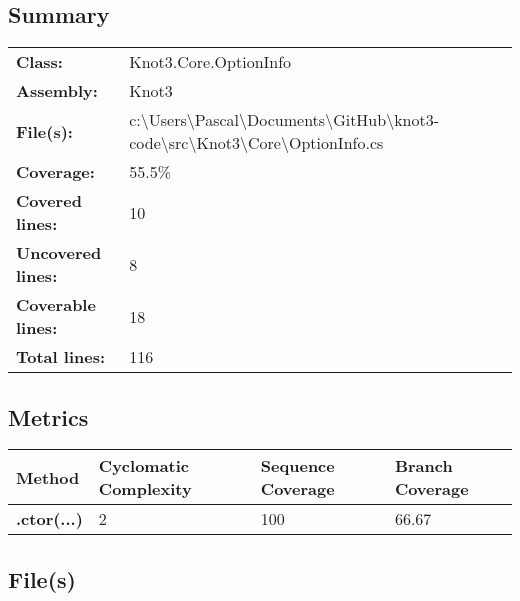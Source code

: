 \documentclass[a4paper,10pt]{article}
\begin{document}
\subsection{Summary}
\begin{longtable}[l]{ll}
\textbf{Class:} & Knot3.Core.OptionInfo\\
\textbf{Assembly:} & Knot3\\
\textbf{File(s):} & \begin{minipage}[t]{12cm}{c:\textbackslash Users\textbackslash Pascal\textbackslash Documents\textbackslash GitHub\textbackslash knot3-code\textbackslash src\textbackslash Knot3\textbackslash Core\textbackslash OptionInfo.cs}\end{minipage} \\
\textbf{Coverage:} & 55.5\%\\
\textbf{Covered lines:} & 10\\
\textbf{Uncovered lines:} & 8\\
\textbf{Coverable lines:} & 18\\
\textbf{Total lines:} & 116\\
\end{longtable}
\subsection{Metrics}
\begin{longtable}[l]{|l|l|l|l|}
\hline
\textbf{Method} & \textbf{Cyclomatic Complexity} & \textbf{Sequence Coverage} & \textbf{Branch Coverage}\\
\hline
\textbf{.ctor(...)} & 2 & 100 & 66.67\\
\hline
\end{longtable}
\subsection{File(s)}
\end{document}
